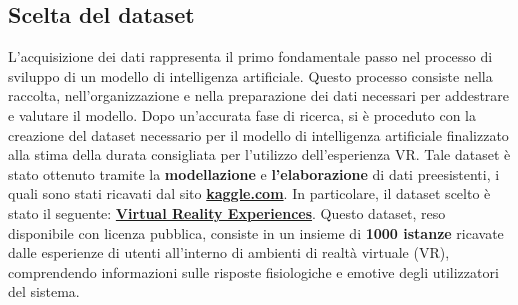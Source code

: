 \subsection{Scelta del dataset}
\fancyhead{}    %
\label{paragrafo 2.1}
\par{
L'acquisizione dei dati rappresenta il primo fondamentale passo nel processo di sviluppo di un modello di intelligenza artificiale. Questo processo consiste nella raccolta, nell'organizzazione e nella preparazione dei dati necessari per addestrare e valutare il modello.\newline
Dopo un'accurata fase di ricerca, si è proceduto con la creazione del dataset necessario per il modello di intelligenza artificiale finalizzato alla stima della durata consigliata per l'utilizzo dell'esperienza VR.\newline
Tale dataset è stato ottenuto tramite la \textbf{modellazione} e \textbf {l'elaborazione} di dati preesistenti, i quali sono stati ricavati dal sito \href{https://www.kaggle.com/}{\textbf{kaggle.com}}.\newline
In particolare, il dataset scelto è stato il seguente: \href{https://www.kaggle.com/datasets/aakashjoshi123/virtual-reality-experiences/data}{\textbf{Virtual Reality Experiences}}.\newline
Questo dataset, reso disponibile con licenza pubblica, consiste in un insieme di \textbf{1000 istanze} ricavate dalle esperienze di  utenti all'interno di ambienti di realtà virtuale (VR),
comprendendo informazioni sulle risposte fisiologiche e emotive degli utilizzatori del sistema.
}